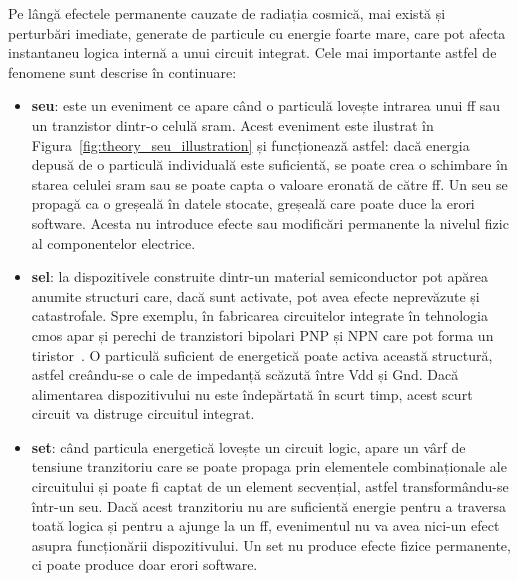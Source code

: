 \documentclass[12pt,a4paper]{report}
\begin{document}
Pe lângă efectele permanente cauzate de radiația cosmică, mai există și perturbări imediate, generate de particule cu energie foarte mare, care pot afecta instantaneu logica internă a unui circuit integrat. Cele mai importante astfel de fenomene sunt descrise în continuare:
\begin{itemize}
    \item \textbf{\gls{seu}}: este un eveniment ce apare când o particulă lovește intrarea unui \gls{ff} sau un tranzistor dintr-o celulă \gls{sram}. Acest eveniment este ilustrat în Figura~\ref{fig:theory_seu_illustration} și funcționează astfel: dacă energia depusă de o particulă individuală este suficientă, se poate crea o schimbare în starea celulei \gls{sram} sau se poate capta o valoare eronată de către \gls{ff}. Un \gls{seu} se propagă ca o greșeală în datele stocate, greșeală care poate duce la erori software. Acesta nu introduce efecte sau modificări permanente la nivelul fizic al componentelor electrice.
    \item \textbf{\gls{sel}}: la dispozitivele construite dintr-un material semiconductor pot apărea anumite structuri care, dacă sunt activate, pot avea efecte neprevăzute și catastrofale. Spre exemplu, în fabricarea circuitelor integrate în tehnologia \gls{cmos} apar și perechi de tranzistori bipolari PNP și NPN care pot forma un tiristor~\cite{parasitic_transistors}. O particulă suficient de energetică poate activa această structură, astfel creându-se o cale de impedanță scăzută între Vdd și Gnd. Dacă alimentarea dispozitivului nu este îndepărtată în scurt timp, acest scurt circuit va distruge circuitul integrat.
    \item \textbf{\gls{set}}: când particula energetică lovește un circuit logic, apare un vârf de tensiune tranzitoriu care se poate propaga prin elementele combinaționale ale circuitului și poate fi captat de un element secvențial, astfel transformându-se într-un \gls{seu}. Dacă acest tranzitoriu nu are suficientă energie pentru a traversa toată logica și pentru a ajunge la un \gls{ff}, evenimentul nu va avea nici-un efect asupra funcționării dispozitivului. Un \gls{set} nu produce efecte fizice permanente, ci poate produce doar erori software.
\end{itemize}
\end{document}
